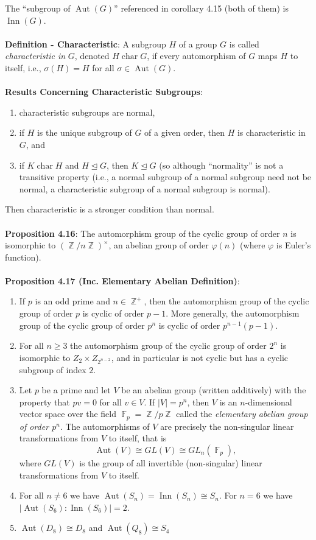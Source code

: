 \documentclass{article}
\DeclareMathOperator{\Z}{\mathbb{Z}}
\DeclareMathOperator{\F}{\mathbb{F}}
\DeclareMathOperator{\aut}{Aut}
\DeclareMathOperator{\inn}{Inn}
\DeclareMathOperator{\Char}{char}
\begin{document}
The ``subgroup of $\aut(G)$'' referenced in corollary 4.15 (both of them) is $\inn(G)$. \\ \\
\textbf{Definition - Characteristic}: A subgroup $H$ of a group $G$ is called \textit{characteristic in} $G$, denoted $H \Char G$, if every automorphism of $G$ maps $H$ to itself, i.e., $\sigma(H) = H$ for all $\sigma \in \aut(G)$. \\ \\
\textbf{Results Concerning Characteristic Subgroups}: \begin{enumerate}
    \item characteristic subgroups are normal,
    \item if $H$ is the unique subgroup of $G$ of a given order, then $H$ is characteristic in $G$, and
    \item if $K \Char H$ and $H \trianglelefteq G$, then $K \trianglelefteq G$ (so although ``normality'' is not a transitive property (i.e., a normal subgroup of a normal subgroup need not be normal, a characteristic subgroup of a normal subgroup is normal).
\end{enumerate} Then characteristic is a stronger condition than normal. \\ \\
\textbf{Proposition 4.16}: The automorphism group of the cyclic group of order $n$ is isomorphic to $(\Z/n\Z)^\times$, an abelian group of order $\varphi(n)$ (where $\varphi$ is Euler's function). \\ \\
\textbf{Proposition 4.17 (Inc. Elementary Abelian Definition)}: \begin{enumerate}
    \item If $p$ is an odd prime and $n \in \Z^+$, then the automorphism group of the cyclic group of order $p$ is cyclic of order $p - 1$. More generally, the automorphism group of the cyclic group of order $p^n$ is cyclic of order $p^{n - 1}(p - 1)$. 
    \item For all $n \geq 3$ the automorphism group of the cyclic group of order $2^n$ is isomorphic to $Z_2 \times Z_{2^{n - 2}}$, and in particular is not cyclic but has a cyclic subgroup of index $2$. 
    \item Let $p$ be a prime and let $V$ be an abelian group (written additively) with the property that $pv = 0$ for all $v \in V$. If $|V| = p^n$, then $V$ is an $n$-dimensional vector space over the field $\F_p = \Z/p\Z$ called the \textit{elementary abelian group of order $p^n$}. The automorphisms of $V$ are precisely the non-singular linear transformations from $V$ to itself, that is $$\aut(V) \cong GL(V) \cong GL_n(\F_p),$$ where $GL(V)$ is the group of all invertible (non-singular) linear transformations from $V$ to itself.
    \item For all $n \neq 6$ we have $\aut(S_n) = \inn(S_n) \cong S_n$. For $n = 6$ we have $|\aut(S_6) : \inn(S_6)| = 2$.
    \item $\aut(D_8) \cong D_8$ and $\aut(Q_8) \cong S_4$
\end{enumerate} $ $ \\
\end{document}
